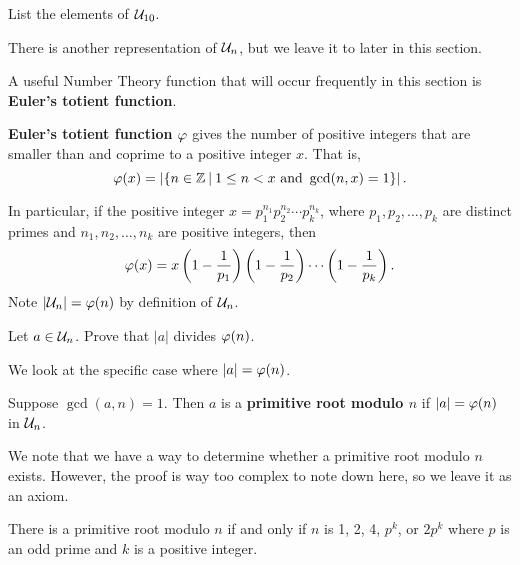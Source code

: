 \begin{exercise}
    List the elements of $\mathcal{U}_{10}$.
\end{exercise}

There is another representation of $\mathcal{U}_{n}$, but we leave it to later in this section.

A useful Number Theory function that will occur frequently in this section is \textbf{Euler's totient function}.

\begin{definition}
    \textbf{Euler's totient function} $\varphi$ gives the number of positive integers that are smaller than and coprime to a positive integer $x$. That is,
    \[
        \totient(x) = \left|\{n \in \Z \vert 1 \leq n < x \text{ and } \gcd(n, x) = 1\}\right|.
    \]
\end{definition}
In particular, if the positive integer $x = p_1^{n_1}p_2^{n_2}\cdots p_k^{n_k}$, where $p_1, p_2, \dots, p_k$ are distinct primes and $n_1,n_2,\dots,n_k$ are positive integers, then
\[
    \varphi(x) = x \left(1 - \frac1{p_1}\right)\left(1 - \frac1{p_2}\right)\cdots\left(1 - \frac1{p_k}\right).
\]
Note $|\mathcal{U}_{n}| = \varphi(n)$ by definition of $\mathcal{U}_{n}$.

\begin{exercise}\label{exercise-order-of-a-divides-phi-a}
    Let $a \in \mathcal{U}_{n}$. Prove that $|a|$ divides $\varphi(n)$.
\end{exercise}

We look at the specific case where $|a| = \varphi(n)$.
\begin{definition}
    Suppose $\gcd(a, n) = 1$. Then $a$ is a \textbf{primitive root modulo $n$} if $|a| = \varphi(n)$ in $\mathcal{U}_{n}$.
\end{definition}

We note that we have a way to determine whether a primitive root modulo $n$ exists. However, the proof is way too complex to note down here, so we leave it as an axiom.
\begin{axiom}
    There is a primitive root modulo $n$ if and only if $n$ is 1, 2, 4, $p^k$, or $2p^k$ where $p$ is an odd prime and $k$ is a positive integer.
\end{axiom}

